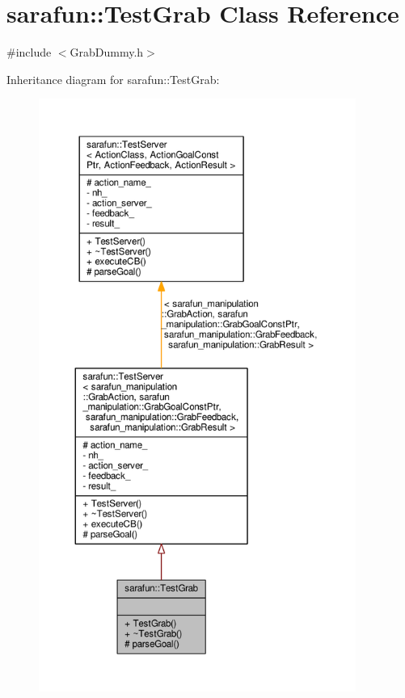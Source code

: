 \hypertarget{classsarafun_1_1TestGrab}{\section{sarafun\-:\-:Test\-Grab Class Reference}
\label{classsarafun_1_1TestGrab}
}


{\ttfamily \#include $<$Grab\-Dummy.\-h$>$}



Inheritance diagram for sarafun\-:\-:Test\-Grab\-:\nopagebreak
\begin{figure}[H]
\begin{center}
\leavevmode
\includegraphics[height=550pt]{dc/d55/classsarafun_1_1TestGrab__inherit__graph}
\end{center}
\end{figure}



